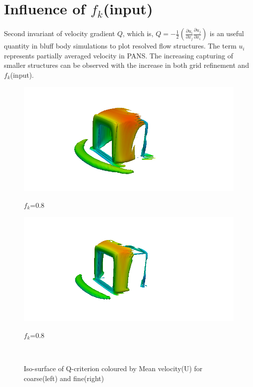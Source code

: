 \section{Influence of $f_k$(input)}
Second invariant of velocity gradient $Q$, which is,  \(Q=-\frac{1}{2}(\frac{\partial u_i}{\partial x_j}\frac{\partial u_j}{\partial x_i})\) is an useful quantity in bluff body simulations to plot resolved flow structures. The term $u_i$ represents partially averaged velocity in PANS. The increasing capturing of smaller structures can be observed with the increase in both grid refinement and $f_k$(input).
\begin{figure}[H]
\begin{minipage}[b]{0.5\linewidth}
\includegraphics[scale=0.25]{figure/coarse/eight/iso.png}
\caption*{$f_k$=0.8}
\end{minipage}
\begin{minipage}[b]{0.5\linewidth}
\includegraphics[scale=0.25]{figure/fine/eight/iso.png}
\caption*{$f_k$=0.8}
\end{minipage}\\
\caption{Iso-surface of Q-criterion coloured by Mean velocity(U) for coarse(left) and fine(right)}
\end{figure}
